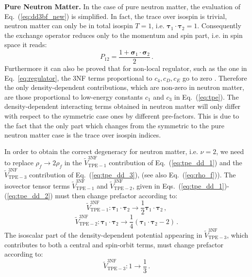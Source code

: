 {\bf Pure Neutron Matter.} In the case of pure neutron matter, the evaluation of Eq.~(\ref{eq:dd3bf_new}) is simplified. In fact,
the trace over isospin is trivial, neutron matter can only be in total isospin $T=1$, i.e. $\boldsymbol\tau_1\cdot\boldsymbol\tau_2=1$. Consequently the exchange operator reduces only to the momentum and spin part, i.e. in spin space it reads:
\begin{equation}
P_{12}=\frac{1+\boldsymbol\sigma_1\cdot\boldsymbol\sigma_2}{2}\,.
\label{eq:perm_op_2}
\end{equation}
Furthermore it can also be proved that for non-local regulator, such as the one in Eq.~\eqref{eq:regulator}, the 3NF terms proportional to $c_4, c_D, c_E$ go to zero \cite{ch11_Tolos2008,ch11_Hebeler2010Jul}. Therefore the only density-dependent contributions, which are non-zero in neutron matter, are those proportional to low-energy constants $c_1$ and $c_3$ in Eq.~(\ref{eq:tpe}). The density-dependent interacting terms obtained in neutron matter will only differ with respect to the symmetric case ones by different pre-factors. This is due to the fact that the only part which changes from the symmetric to the pure neutron matter case is the trace over isospin indices. 

In order to obtain the correct degeneracy for neutron matter, i.e.  $\nu=2$, we need to replace $\rho_f \rightarrow 2\rho_f$ in the $\widetilde V_\mathrm{TPE-1}^\mathrm{3NF}$ contribution of Eq.~(\ref{eq:tpe_dd_1}) and the $\widetilde V_\mathrm{TPE-3}^\mathrm{3NF}$ contribution of Eq.~(\ref{eq:tpe_dd_3}), (see also Eq.~(\ref{eq:rho_f})). The isovector tensor terms $\widetilde V_\mathrm{TPE-1}^\mathrm{3NF}$ and  $\widetilde V_\mathrm{TPE-2}^\mathrm{3NF}$, given in Eqs.~(\ref{eq:tpe_dd_1})-(\ref{eq:tpe_dd_2}) must then change prefactor according to:
\begin{equation}
\widetilde V_\mathrm{TPE-1}^\mathrm{3NF}: \boldsymbol\tau_1\cdot\boldsymbol\tau_2 \rightarrow \frac{1}{2}\boldsymbol\tau_1\cdot\boldsymbol\tau_2\,, 
\label{eq:pnm_tpe_1}
\end{equation}
\begin{equation}
\widetilde V_\mathrm{TPE-2}^\mathrm{3NF}: \boldsymbol\tau_1\cdot\boldsymbol\tau_2 \rightarrow 
\frac{1}{4}(\boldsymbol\tau_1\cdot\boldsymbol\tau_2-2)\,.
\label{eq:pnm_tpe_2}
\end{equation}
The isoscalar part of the density-dependent potential appearing in $\widetilde V_\mathrm{TPE-3}^\mathrm{3NF}$, which contributes to both a central and spin-orbit terms, must change prefactor according to:
\begin{equation}
\widetilde V_\mathrm{TPE-3}^\mathrm{3NF}: 1 \rightarrow \frac{1}{3}\,.
\label{eq:pnm_tpe_3}
\end{equation}











